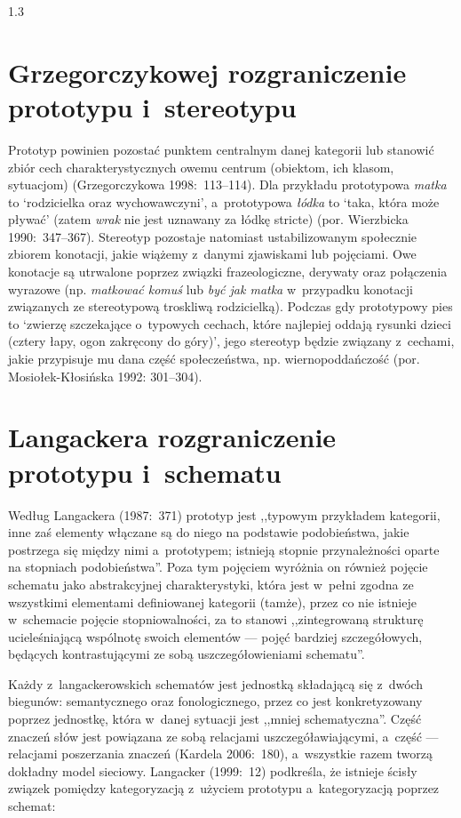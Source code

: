 \documentclass[11pt,a4paper,twoside]{report}
\begin{document}
\begin{spacing}{1.3}
\section{Grzegorczykowej rozgraniczenie prototypu i~stereotypu}
\enlargethispage{-5\baselineskip}
Prototyp powinien pozostać punktem centralnym danej kategorii lub stanowić zbiór cech charakterystycznych owemu centrum (obiektom, ich klasom, sytuacjom) (Grzegorczykowa 1998:~113--114). Dla przykładu prototypowa \emph{matka} to ‘rodzicielka oraz wychowawczyni’, a~prototypowa \emph{łódka} to ‘taka, która może pływać’ (zatem \emph{wrak} nie jest uznawany za łódkę stricte) (por. Wierzbicka 1990:~347--367). Stereotyp pozostaje natomiast ustabilizowanym społecznie zbiorem konotacji, jakie wiążemy z~danymi zjawiskami lub pojęciami. Owe konotacje są utrwalone poprzez związki frazeologiczne, derywaty oraz połączenia wyrazowe (np. \emph{matkować komuś} lub \emph{być jak matka} w~przypadku konotacji związanych ze stereotypową troskliwą rodzicielką). Podczas gdy prototypowy pies to ‘zwierzę szczekające o~typowych cechach, które najlepiej oddają rysunki dzieci (cztery łapy, ogon zakręcony do góry)’, jego stereotyp będzie związany z~cechami, jakie przypisuje mu dana część społeczeństwa, np. wiernopoddańczość (por. Mosiołek-Kłosińska 1992: 301--304).

\section{Langackera rozgraniczenie prototypu i~schematu}

Według Langackera (1987:~371) prototyp jest ,,typowym przykładem kategorii, \linebreak inne zaś elementy włączane są do niego na podstawie podobieństwa, jakie postrzega się między nimi a~prototypem; istnieją stopnie przynależności oparte na stopniach podobieństwa''. Poza tym pojęciem wyróżnia on również pojęcie schematu jako abstrakcyjnej charakterystyki, która jest w~pełni zgodna ze wszystkimi elementami definiowanej kategorii (tamże), przez co nie istnieje w~schemacie pojęcie stopniowalności, za to stanowi ,,zintegrowaną strukturę ucieleśniającą wspólnotę swoich elementów --- pojęć bardziej szczegółowych, będących kontrastującymi ze sobą uszczegółowieniami schematu''.

Każdy z~langackerowskich schematów jest jednostką składającą się z~dwóch biegunów: semantycznego oraz fonologicznego, przez co jest konkretyzowany poprzez jednostkę, która w~danej sytuacji jest ,,mniej schematyczna''. Część znaczeń słów jest powiązana ze sobą relacjami uszczegóławiającymi, a~część --- relacjami poszerzania znaczeń (Kardela 2006:~180), a~wszystkie razem tworzą dokładny model sieciowy. Langacker (1999:~12) podkreśla, że istnieje ścisły związek pomiędzy kategoryzacją z~użyciem prototypu a~kategoryzacją poprzez schemat:
\end{spacing}
\end{document}
